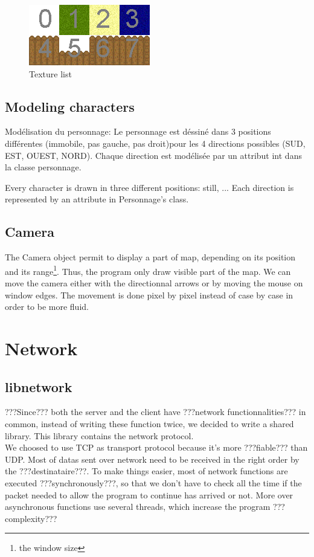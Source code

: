\documentclass{scrreprt}
\begin{document}
	\begin{figure}
	\begin{center}
	\includegraphics{image1.png}
	\end{center}
	\caption{Texture list}
	\end{figure}

	\subsection{Modeling characters}
	Modélisation du personnage:
	Le personnage est déssiné dans 3 positions différentes (immobile, pas gauche, pas droit)pour les 4 directions possibles (SUD, EST, OUEST, NORD). Chaque direction est modélisée par un attribut int dans la classe personnage.

	Every character is drawn in three different positions: still, ... Each direction is represented by an attribute in Personnage's class.
	\subsection{Camera}
	The Camera object permit to display a part of map, depending on its position and its range\footnote{the window size}. Thus, the program only draw visible part of the map. We can move the camera either with the directionnal arrows or by moving the mouse on window edges. The movement is done pixel by pixel instead of case by case in order to be more fluid.

	\section{Network}
	\subsection{libnetwork}
	???Since??? both the server and the client have ???network functionnalities??? in common, instead of writing these function twice, we decided to write a shared library. This library contains the network protocol.\\

		We choosed to use TCP as transport protocol because it's more ???fiable??? than UDP. Most of datas sent over network need to be received in the right order by the ???destinataire???. To make things easier, most of network functions are executed ???synchronously???, so that we don't have to check all the time if the packet needed to allow the program to continue has arrived or not. More over asynchronous functions use several threads, which increase the program ???complexity???\\
\end{document}
